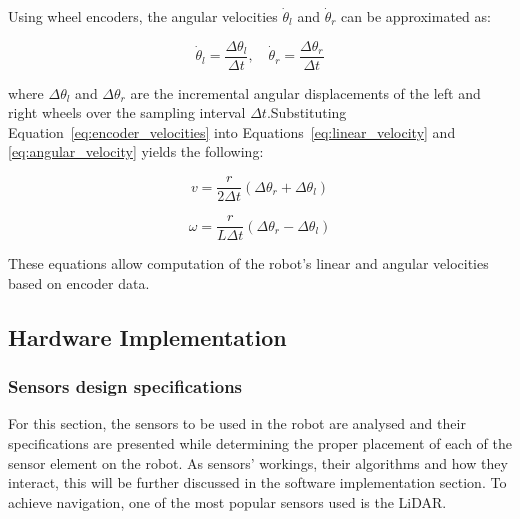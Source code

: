 \noindent Using wheel encoders, the angular velocities \( \dot{\theta}_l \) and \( \dot{\theta}_r \) can be approximated as:

\begin{equation}
\dot{\theta}_l = \frac{\Delta \theta_l}{\Delta t}, \quad \dot{\theta}_r = \frac{\Delta \theta_r}{\Delta t}
\label{eq:encoder_velocities}
\end{equation}

\noindent where \( \Delta \theta_l \) and \( \Delta \theta_r \) are the incremental angular
displacements of the left and right wheels over the sampling interval \( \Delta t \).Substituting
Equation~\eqref{eq:encoder_velocities} into Equations~\eqref{eq:linear_velocity} 
and \eqref{eq:angular_velocity} yields the following:

\begin{equation}
v = \frac{r}{2 \Delta t} \left( \Delta \theta_r + \Delta \theta_l \right)
\label{eq:linear_velocity_encoder}
\end{equation}

\begin{equation}
\omega = \frac{r}{L \Delta t} \left( \Delta \theta_r - \Delta \theta_l \right)
\label{eq:angular_velocity_encoder}
\end{equation}

\noindent These equations allow computation of the robot's linear and angular velocities based on encoder data.


\newpage
\subsection{Hardware Implementation}



\subsubsection{Sensors design specifications}
For this section, the sensors to be used in the robot are analysed and their specifications are presented while determining the proper placement of each of the sensor element on the robot. 
As sensors' workings, their algorithms and how they interact, this will be further discussed in the software implementation section. 
To achieve navigation, one of the most popular sensors used is the LiDAR. 



